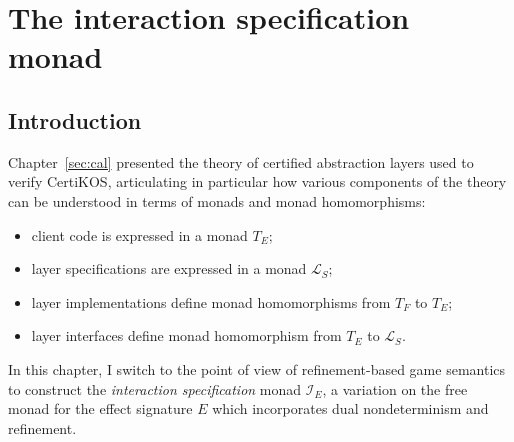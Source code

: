 \documentclass[11pt,oneside]{book}
\theoremstyle{definition}
\begin{document}



\chapter{The interaction specification monad} \label{sec:intspec} %

\section{Introduction} %

Chapter~\ref{sec:cal} presented
the theory of certified abstraction layers
used to verify CertiKOS,
articulating in particular
how various components of the theory
can be understood
in terms of monads and monad homomorphisms:
\begin{itemize}
  \item client code is expressed in a monad $T_E$;
  \item layer specifications are expressed in a monad $\mathcal{L}_S$;
  \item layer implementations define monad homomorphisms from $T_F$ to $T_E$;
  \item layer interfaces define monad homomorphism from $T_E$ to $\mathcal{L}_S$.
\end{itemize}
In this chapter,
I switch to the point of view of refinement-based game semantics
to construct the \emph{interaction specification} monad $\mathcal{I}_E$,
a variation on the free monad for the effect signature $E$
which incorporates dual nondeterminism and refinement.
\end{document}
